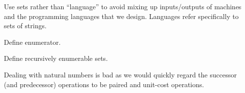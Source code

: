 Use sets rather than ``language'' to avoid mixing up inputs/outputs of machines
and the programming languages that we design. Languages refer specifically to
sets of strings.

\begin{definition}

Define enumerator.

\end{definition}

\begin{definition}

Define recursively enumerable sets.

\end{definition}

Dealing with natural numbers is bad as we would quickly regard the successor
(and predecessor) operations to be paired and unit-cost operations.













